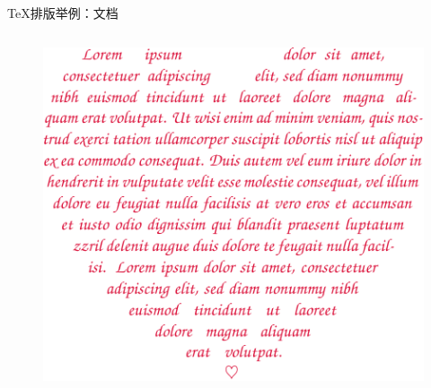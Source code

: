 \documentclass[xcolor=table,dvipsnames,svgnames]{beamer}
\begin{document}
\begin{frame}{\TeX{}排版举例：文档}
\begin{columns}
\begin{column}{.45\textwidth}
\begin{figure}[h]
        \includegraphics[width=\textwidth]{shapepar.pdf}
      \end{figure}
    \end{column}
  \end{columns}
\end{frame}
\end{document}
